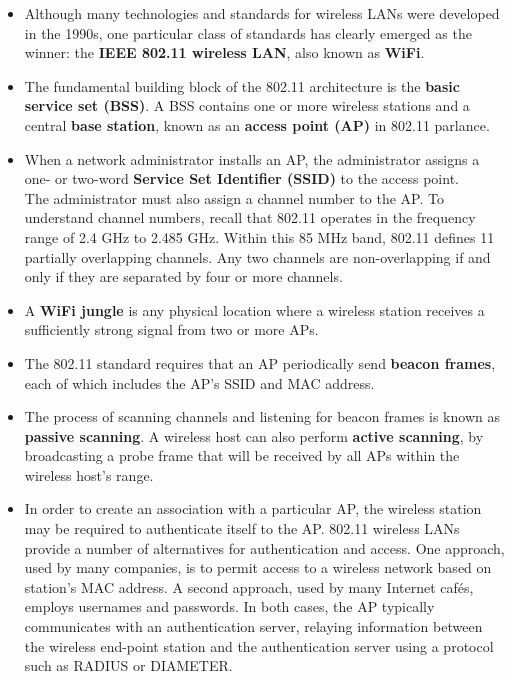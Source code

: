 \begin{itemize}
\item
Although many technologies and standards for wireless LANs were developed in the 1990s, one particular class of standards has clearly emerged as the winner: the \textbf{IEEE 802.11 wireless LAN}, also known as \textbf{WiFi}.

\item
The fundamental building block of the 802.11 architecture is the \textbf{basic service set (BSS)}. A BSS contains one or more wireless stations and a central \textbf{base station}, known as an \textbf{access point (AP)} in 802.11 parlance.

\item
When a network administrator installs an AP, the administrator assigns a one- or two-word \textbf{Service Set Identifier (SSID)} to the access point.\\
The administrator must also assign a channel number to the AP. To understand channel numbers, recall that 802.11 operates in the frequency range of 2.4 GHz to 2.485 GHz. Within this 85 MHz band, 802.11 defines 11 partially overlapping channels. Any two channels are non-overlapping if and only if they are separated by four or more channels.

\item
A \textbf{WiFi jungle} is any physical location where a wireless station receives a sufficiently strong signal from two or more APs.

\item
The 802.11 standard requires that an AP periodically send \textbf{beacon frames}, each of which includes the AP's SSID and MAC address.

\item
The process of scanning channels and listening for beacon frames is known as \textbf{passive scanning}. A wireless host can also perform \textbf{active scanning}, by broadcasting a probe frame that will be received by all APs within the wireless host's range.

\item
In order to create an association with a particular AP, the wireless station may be required to authenticate itself to the AP. 802.11 wireless LANs provide a number of alternatives for authentication and access. One approach, used by many companies, is to permit access to a wireless network based on station's MAC address. A second approach, used by many Internet caf\'{e}s, employs usernames and passwords. In both cases, the AP typically communicates with an authentication server, relaying information between the wireless end-point station and the authentication server using a protocol such as RADIUS or DIAMETER.


\end{itemize}
